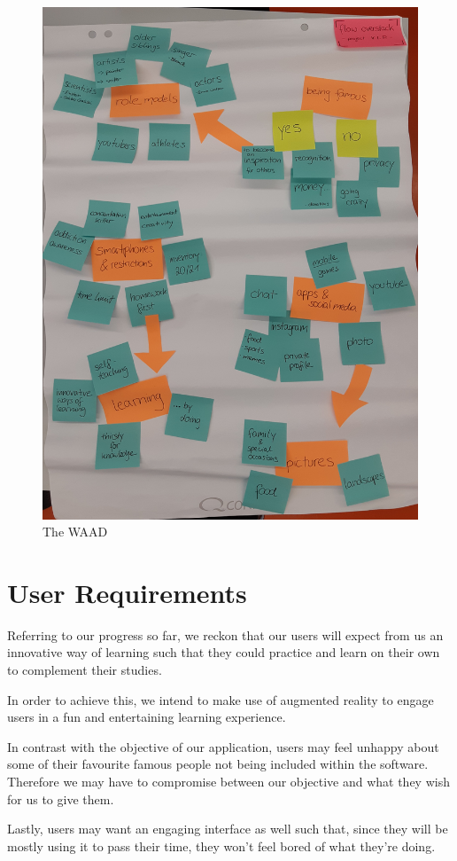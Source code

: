 \documentclass[12pt]{scrartcl}
\begin{document}
\begin{figure}[H]
	\centering
	\includegraphics[scale = 0.12]{WAAD.jpg}
	\caption{The WAAD}
	\label{WAAD}
\end{figure}

\section*{User Requirements}
	Referring to our progress so far, we reckon that our users will expect from us an innovative way
	of learning such that they could practice and learn on their own to complement their studies.
	
	In order to achieve this, we intend to make use of augmented reality to engage users in a fun
	and entertaining learning experience.
	
	In contrast with the objective of our application, users may feel unhappy about some of their
	favourite famous people not being included within the software. Therefore we may have to
	compromise between our objective and what they wish for us to give them.
	
	Lastly, users may want an engaging interface as well such that, since they will be mostly using it
	to pass their time, they won't feel bored of what they're doing.
\end{document}
